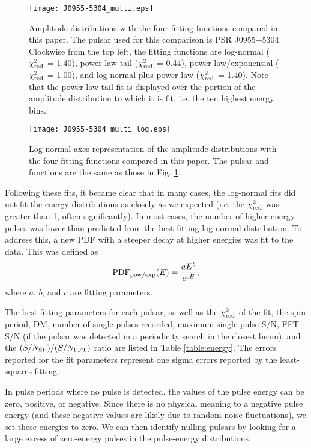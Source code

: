 \documentclass[fleqn,usenatbib]{mnras}
\begin{document}
\begin{figure*}
\centering
\texttt{[image: J0955-5304\_multi.eps]}
\caption[Comparison of Fitting Functions]{Amplitude distributions with the four fitting functions
compared in this paper. The pulsar used for this comparison is PSR J0955$-$5304. Clockwise from the
top left, the fitting functions are log-normal ($\chi_{\rm red}^2$ = 1.40), power-law tail ($\chi_{\rm red}^2$ = 0.44), power-law$/$exponential ($\chi_{\rm red}^2$ = 1.00), and log-normal plus power-law ($\chi_{\rm red}^2$ = 1.40). Note that the power-law tail fit is displayed over the portion of the amplitude distribution to which it is fit, i.e. the ten highest energy bins.}
\label{fig:fit_comparison}
\end{figure*}

\begin{figure*}
\centering
\texttt{[image: J0955-5304\_multi\_log.eps]}
\caption[Comparison of Fitting Functions (log-normal)]{Log-normal axes representation of the amplitude distributions with the four fitting functions compared in this paper. The pulsar and functions are the same as those in Fig. \ref{fig:fit_comparison}.}
\label{fig:fit_comparison_log}
\end{figure*}

Following these fits, it became clear that in many cases, the log-normal fits did not fit the energy
distributions as closely as we expected (i.e. the $\chi_{\rm red}^2$ was greater than 1, often
significantly). In most cases, the number of higher energy pulses was lower than predicted 
from the best-fitting log-normal distribution. To address this, a new PDF with a steeper decay at 
higher energies was fit to the data. This was defined as 
\begin{equation}
{\rm PDF}_{\rm pow/exp}(E)=\frac{aE^{b}}{e^{cE}},
\label{eq:powexp}
\end{equation}
where $a$, $b$, and $c$ are fitting parameters.

The best-fitting parameters for each pulsar, as well as the $\chi_{\rm red}^2$ of the fit, the spin
period, DM, number of single pulses recorded, maximum single-pulse S/N, FFT S/N (if the pulsar was
detected in a periodicity search in the closest beam), and the $(S/N_{\rm SP})/(S/N_{\rm FFT})$
ratio are listed in Table \ref{table:energy}. The errors reported for the fit parameters represent
one sigma errors reported by the least-squares fitting.

In pulse periods where no pulse is detected, the values of the pulse energy can be zero, positive,
or negative. Since there is no physical meaning to a negative pulse energy (and these negative
values are likely due to random noise fluctuations), we set these energies to zero. We can then
identify nulling pulsars by looking for a large excess of zero-energy pulses in the pulse-energy 
distributions.
\end{document}
